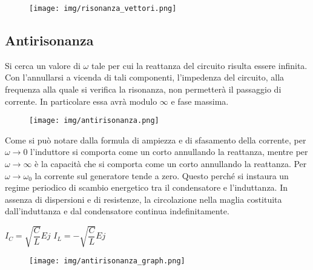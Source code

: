 \documentclass{article}
\begin{document}
\begin{figure}[h!]
    \begin{center}
        \texttt{[image: img/risonanza\_vettori.png]}
    \end{center}
\end{figure}

\subsection{Antirisonanza}
\medskip

\noindent{}
\medskip

\noindent Si cerca un valore di $\omega$ tale per cui la reattanza del circuito risulta essere infinita.
Con l'annullarsi a vicenda di tali componenti, l'impedenza del circuito, alla frequenza alla quale si verifica la risonanza, non permetterà
il passaggio di corrente. In particolare essa avrà modulo $\infty$ e fase massima. 


\begin{figure}[h!]
    \begin{center}
        \texttt{[image: img/antirisonanza.png]}
    \end{center}
\end{figure}

\noindent Come si può notare dalla formula di ampiezza e di sfasamento della corrente, per $\omega\rightarrow0$ l'induttore si comporta
come un corto annullando la reattanza, mentre per $\omega\rightarrow\infty$ è la capacità che si comporta
come un corto annullando la reattanza. Per $\omega\rightarrow\omega_0$ la corrente sul generatore tende a zero.
Questo perché si instaura  un regime periodico di scambio energetico tra il condensatore e l'induttanza. In assenza di dispersioni e di
 resistenze, la circolazione nella maglia costituita dall'induttanza e dal condensatore continua indefinitamente.
\medskip

 \noindent $I_C=\sqrt{\dfrac{C}{L}}Ej$ \space $I_L=-\sqrt{\dfrac{C}{L}}Ej$

\begin{figure}[h!]
    \begin{center}
        \texttt{[image: img/antirisonanza\_graph.png]}
    \end{center}
\end{figure}
\end{document}
